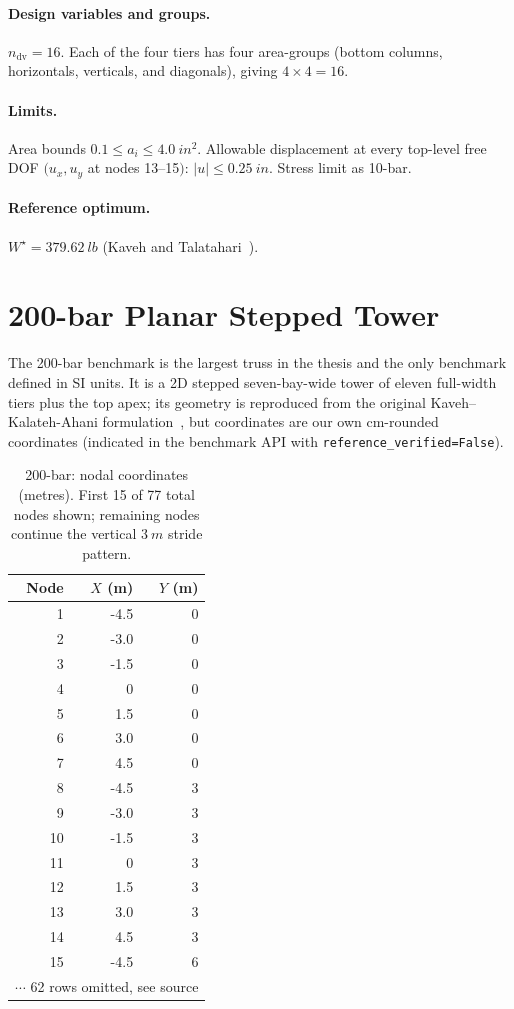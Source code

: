 \paragraph{Design variables and groups.} $n_{\mathrm{dv}}=16$.
Each of the four tiers has four area-groups (bottom columns,
horizontals, verticals, and diagonals), giving $4\times 4=16$.

\paragraph{Limits.} Area bounds $\num{0.1}\le a_i\le\SI{4.0}{in^2}$.
Allowable displacement at every top-level free DOF
$(u_x, u_y$ at nodes 13--15$)$: $|u|\le\SI{0.25}{in}$.
Stress limit as 10-bar.

\paragraph{Reference optimum.}
$W^\star=\SI{379.62}{lb}$ (Kaveh and Talatahari~\cite{kaveh2010}).

\section{200-bar Planar Stepped Tower}
\label{app:geom:200bar}

The 200-bar benchmark is the largest truss in the thesis and the
only benchmark defined in SI units. It is a 2D stepped
seven-bay-wide tower of eleven full-width tiers plus the top
apex; its geometry is reproduced from the original
Kaveh--Kalateh-Ahani formulation~\cite{kaveh2011}, but
coordinates are our own cm-rounded coordinates (indicated in the
benchmark API with \texttt{reference\_verified=False}).

\begin{table}[h]
  \centering
  \small
  \caption{200-bar: nodal coordinates (metres). First 15 of 77
    total nodes shown; remaining nodes continue the vertical
    $\SI{3}{m}$ stride pattern.}
  \label{tab:geom:200bar:nodes}
  \begin{tabular}{rrr}
  \toprule
  Node & $X$ (m) & $Y$ (m) \\
  \midrule
  1 & -4.5 & 0 \\ 2 & -3.0 & 0 \\ 3 & -1.5 & 0 \\
  4 & 0 & 0 \\ 5 & 1.5 & 0 \\ 6 & 3.0 & 0 \\ 7 & 4.5 & 0 \\
  8 & -4.5 & 3 \\ 9 & -3.0 & 3 \\ 10 & -1.5 & 3 \\
  11 & 0 & 3 \\ 12 & 1.5 & 3 \\ 13 & 3.0 & 3 \\ 14 & 4.5 & 3 \\
  15 & -4.5 & 6 \\
  \multicolumn{3}{c}{$\cdots$ 62 rows omitted, see source} \\
  \bottomrule
  \end{tabular}
\end{table}

